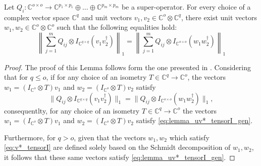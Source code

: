 \begin{lemma} \label{lemma:uv*_tensorI_gen}
  Let $Q_i: \mathbb{C}^{o \times o}  \rightarrow \mathbb{C}^{p_1 \times p_1} \oplus \ldots \oplus  \mathbb{C}^{p_m \times p_m}$ be a super-operator.  For every choice of a complex vector space $\mathbb{C}^{q}$ and unit vectors $v_1, v_2 \in \mathbb{C}^{o} \otimes \mathbb{C}^{q}$, there exist unit vectors $w_1, w_2 \in \mathbb{C}^{o} \otimes \mathbb{C}^{o}$ such that the following equalities hold:
  \begin{equation} \label{eq:lemma_uv*_tensorI_gen}
      \left\lVert \sum_{j=1}^{m} Q_{ij} \otimes I_{\mathbb{C}^{q \times q}} (v_1 v_2^\dag)\right\rVert_{1} = \left\lVert \sum_{j=1}^{m} Q_{ij} \otimes I_{\mathbb{C}^{o \times o}} (w_1 w_2^\dag) \right\rVert_{1}
  \end{equation}
 \begin{proof}
  The proof of this Lemma follows form the one presented in \cite[Proof of Lemma 3.45]{watrous2018theory}. Considering that for $q \leq o$, if for any choice of an isometry $T \in \mathbb{C}^{q} \rightarrow \mathbb{C}^{o} $, the vectors $w_1 = (I_{\mathbb{C}^{o}} \otimes T)v_1$ and $w_2 = (I_{\mathbb{C}^{o}} \otimes T)v_2$  satisfy 
  \begin{equation} \label{eq:v*_tensorI}
    \lVert Q_{ij} \otimes I_{\mathbb{C}^{q \times q}} (v_1 v_2^\dag)\rVert_{1} = \lVert Q_{ij} \otimes I_{\mathbb{C}^{o \times o}} (w_1 w_2^\dag)\rVert_{1},
  \end{equation}
consequentlty, for any choice of an isometry $T \in \mathbb{C}^{q} \rightarrow \mathbb{C}^{o}$ the vectors $w_1 = (I_{\mathbb{C}^{o}} \otimes T)v_1$ and $w_2 = (I_{\mathbb{C}^{o}} \otimes T)v_2$  satisfy \autoref{eq:lemma_uv*_tensorI_gen}.

Furthermore, for $q > o$, given that the vectors $w_1, w_2$ which  satisfy \autoref{eq:v*_tensorI} are defined solely based on the Schmidt decomposition of $w_1, w_2$, it follows that these same vectors satisfy \autoref{eq:lemma_uv*_tensorI_gen}.
 \end{proof}

\end{lemma}


